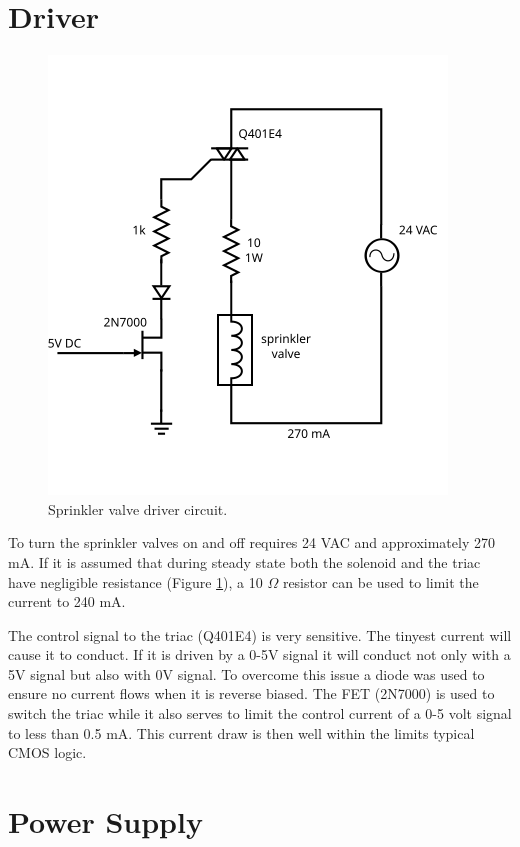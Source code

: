 \documentclass{article}
\begin{document}
\clearpage
\section{Driver}
\label{sec:driver}

\begin{figure}[hbp]
\centering
\includegraphics[scale=1.5]{figs/driver}
\caption{Sprinkler valve driver circuit.}\label{fig:driver}
\end{figure}

To turn the sprinkler valves on and off requires 24 VAC
and approximately 270 mA.
If it is assumed that during steady state both the solenoid
and the triac have negligible resistance (Figure \ref{fig:driver}),
a 10 $\Omega$ resistor can be used to limit the current to 240 mA.

The control signal to the triac (Q401E4) is very sensitive.
The tinyest current will cause it to conduct.
If it is driven by a 0-5V signal it will conduct not only
with a 5V signal but also with 0V signal.
To overcome this issue a diode was used to ensure no current
flows when it is reverse biased.
The FET (2N7000) is used to switch the triac while it also
serves to limit the control current of a 0-5 volt signal
to less than 0.5 mA.
This current draw is then well within the limits typical CMOS logic.


\clearpage
\section{Power Supply}
\label{sec:power}
\end{document}

